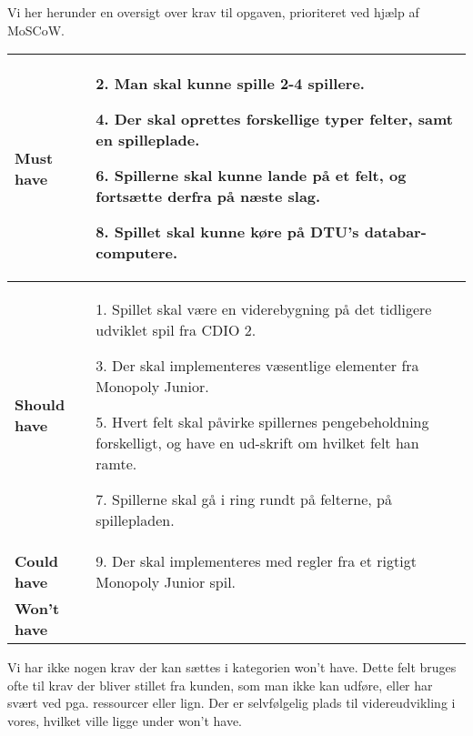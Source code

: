\noindent Vi her herunder en oversigt over krav til opgaven, prioriteret ved hjælp af MoSCoW.

\begin{center}
    \begin{tabular}{ | l | p{13cm} |}
    \hline
    \textbf{Must have}
    &        
        2. Man skal kunne spille 2-4 spillere.

        4. Der skal oprettes forskellige typer felter, samt en spilleplade.
        
        6. Spillerne skal kunne lande på et felt, og fortsætte derfra på næste slag.
        
        8. Spillet skal kunne køre på DTU’s databar-computere.
    \\
    
    \hline
    \textbf{Should have}
    &
        1. Spillet skal være en viderebygning på det tidligere udviklet spil fra CDIO 2.

        3. Der skal implementeres væsentlige elementer fra Monopoly Junior.

        5. Hvert felt skal påvirke spillernes pengebeholdning forskelligt, og have en ud-skrift om hvilket felt han ramte.

        7. Spillerne skal gå i ring rundt på felterne, på spillepladen.
    \\
    \hline
    \textbf{Could have}
    &
        9. Der skal implementeres med regler fra et rigtigt Monopoly Junior spil.
    \\
    \hline
    \textbf{Won't have}
    &

    \\
    \hline
    \end{tabular}
\end{center}

\noindent Vi har ikke nogen krav der kan sættes i kategorien won't have.
Dette felt bruges ofte til krav der bliver stillet fra kunden, som man ikke kan udføre, eller har svært ved pga. ressourcer eller lign.
Der er selvfølgelig plads til videreudvikling i vores, hvilket ville ligge under won't have. 